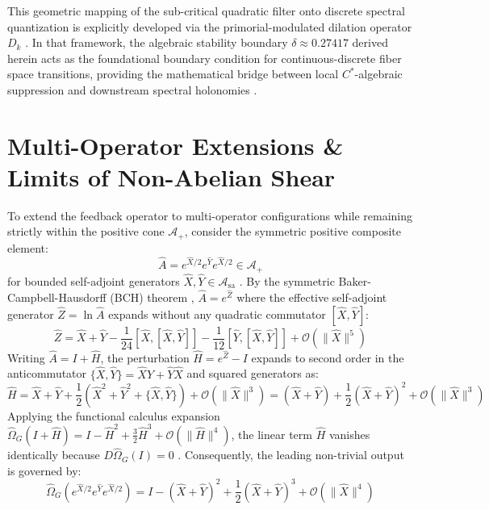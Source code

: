 \documentclass[11pt,a4paper]{article}
\begin{document}
This geometric mapping of the sub-critical quadratic filter onto discrete spectral quantization is explicitly developed via the primorial-modulated dilation operator $D_k$ \cite{GrayDk}. In that framework, the algebraic stability boundary $\delta \approx 0.27417$ derived herein acts as the foundational boundary condition for continuous-discrete fiber space transitions, providing the mathematical bridge between local $C^*$-algebraic suppression and downstream spectral holonomies \cite{GrayDk}.

\section{Multi-Operator Extensions \& Limits of Non-Abelian Shear}

To extend the feedback operator to multi-operator configurations while remaining strictly within the positive cone $\mathcal{A}_+$, consider the symmetric positive composite element:
\begin{equation}
\hat{A} = e^{\hat{X}/2}e^{\hat{Y}}e^{\hat{X}/2} \in \mathcal{A}_+
\end{equation}
for bounded self-adjoint generators $\hat{X}, \hat{Y} \in \mathcal{A}_{\text{sa}}$ \cite{Cartan,Connes}. By the symmetric Baker-Campbell-Hausdorff (BCH) theorem \cite{Hall}, $\hat{A} = e^{\hat{Z}}$ where the effective self-adjoint generator $\hat{Z} = \ln\hat{A}$ expands without any quadratic commutator $[\hat{X}, \hat{Y}]$:
\begin{equation}
\hat{Z} = \hat{X} + \hat{Y} - \frac{1}{24}[\hat{X}, [\hat{X}, \hat{Y}]] - \frac{1}{12}[\hat{Y}, [\hat{X}, \hat{Y}]] + \mathcal{O}(\|\hat{X}\|^5)
\end{equation}
Writing $\hat{A} = I + \hat{H}$, the perturbation $\hat{H} = e^{\hat{Z}} - I$ expands to second order in the anticommutator $\{\hat{X}, \hat{Y}\} = \hat{X}\hat{Y} + \hat{Y}\hat{X}$ and squared generators as:
\begin{equation}
\hat{H} = \hat{X} + \hat{Y} + \frac{1}{2}\left(\hat{X}^2 + \hat{Y}^2 + \{\hat{X}, \hat{Y}\}\right) + \mathcal{O}(\|\hat{X}\|^3) = (\hat{X} + \hat{Y}) + \frac{1}{2}(\hat{X} + \hat{Y})^2 + \mathcal{O}(\|\hat{X}\|^3)
\end{equation}
Applying the functional calculus expansion $\hat{\Omega}_G(I + \hat{H}) = I - \hat{H}^2 + \frac{3}{2}\hat{H}^3 + \mathcal{O}(\|\hat{H}\|^4)$, the linear term $\hat{H}$ vanishes identically because $D\hat{\Omega}_G(I) = 0$ \cite{Murphy,Banach}. Consequently, the leading non-trivial output is governed by:
\begin{equation}
\hat{\Omega}_G\left(e^{\hat{X}/2}e^{\hat{Y}}e^{\hat{X}/2}\right) = I - (\hat{X} + \hat{Y})^2 + \frac{1}{2}(\hat{X} + \hat{Y})^3 + \mathcal{O}(\|\hat{X}\|^4)
\end{equation}
\end{document}
